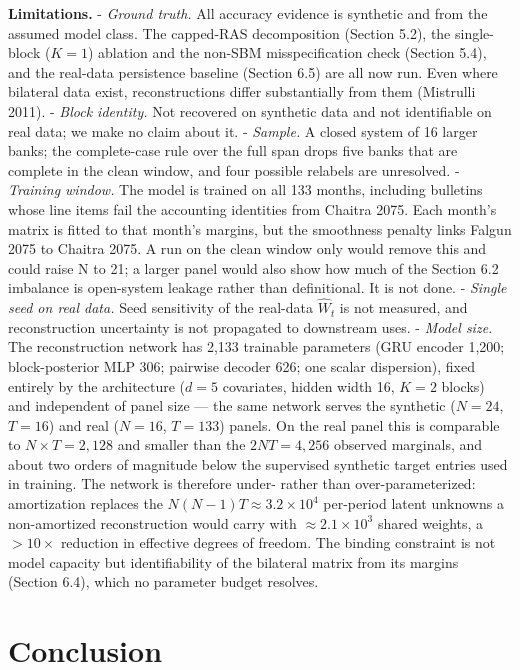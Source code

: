 \documentclass[
  a4paper,
]{article}
\begin{document}
\textbf{Limitations.} - \emph{Ground truth.} All accuracy evidence is
synthetic and from the assumed model class. The capped-RAS decomposition
(Section 5.2), the single-block (\(K=1\)) ablation and the non-SBM
misspecification check (Section 5.4), and the real-data persistence
baseline (Section 6.5) are all now run. Even where bilateral data exist,
reconstructions differ substantially from them (Mistrulli 2011). -
\emph{Block identity.} Not recovered on synthetic data and not
identifiable on real data; we make no claim about it. - \emph{Sample.} A
closed system of 16 larger banks; the complete-case rule over the full
span drops five banks that are complete in the clean window, and four
possible relabels are unresolved. - \emph{Training window.} The model is
trained on all 133 months, including bulletins whose line items fail the
accounting identities from Chaitra 2075. Each month's matrix is fitted
to that month's margins, but the smoothness penalty links Falgun 2075 to
Chaitra 2075. A run on the clean window only would remove this and could
raise N to 21; a larger panel would also show how much of the Section
6.2 imbalance is open-system leakage rather than definitional. It is not
done. - \emph{Single seed on real data.} Seed sensitivity of the
real-data \(\hat W_t\) is not measured, and reconstruction uncertainty
is not propagated to downstream uses. - \emph{Model size.} The
reconstruction network has 2,133 trainable parameters (GRU encoder
1,200; block-posterior MLP 306; pairwise decoder 626; one scalar
dispersion), fixed entirely by the architecture (\(d=5\) covariates,
hidden width 16, \(K=2\) blocks) and independent of panel size --- the
same network serves the synthetic (\(N=24\), \(T=16\)) and real
(\(N=16\), \(T=133\)) panels. On the real panel this is comparable to
\(N \times T = 2{,}128\) and smaller than the \(2NT = 4{,}256\) observed
marginals, and about two orders of magnitude below the supervised
synthetic target entries used in training. The network is therefore
under- rather than over-parameterized: amortization replaces the
\(N(N-1)T \approx 3.2 \times 10^4\) per-period latent unknowns a
non-amortized reconstruction would carry with
\(\approx 2.1 \times 10^3\) shared weights, a \(>10\times\) reduction in
effective degrees of freedom. The binding constraint is not model
capacity but identifiability of the bilateral matrix from its margins
(Section 6.4), which no parameter budget resolves.

\section{Conclusion}\label{sec-conclusions}
\end{document}
